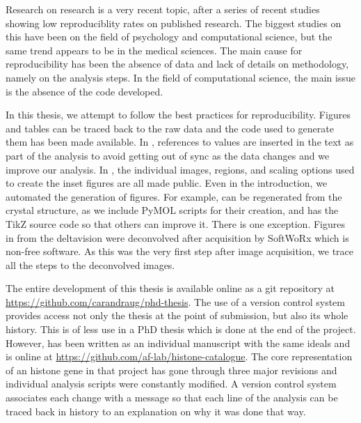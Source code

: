 
Research on research is a very recent topic, after a series of recent
studies showing low reproduciblity rates on published research.  The
biggest studies on this have been on the field of psychology and
computational science, but the same trend appears to be in the medical
sciences.  The main cause for reproducibility has been the absence of
data and lack of details on methodology, namely on the analysis steps.
In the field of computational science, the main issue is the absence
of the code developed.

In this thesis, we attempt to follow the best practices for
reproducibility.  Figures and tables can be traced back to the raw
data and the code used to generate them has been made available.  In
, references to values are inserted in the
text as part of the analysis to avoid getting out of sync as the data
changes and we improve our analysis.  In , the
individual images, regions, and scaling options used to create the
inset figures are all made public.  Even in the introduction, we
automated the generation of figures.  For example,
 can be regenerated from the
crystal structure, as we include PyMOL scripts for their creation, and
 has the TikZ source code so that
others can improve it.  There is one exception.  Figures in
 from the deltavision were deconvolved after
acquisition by SoftWoRx which is non-free software.  As this was the
very first step after image acquisition, we trace all the steps to the
deconvolved images.


The entire development of this thesis is available online as a git
repository at \url{https://github.com/carandraug/phd-thesis}.  The use
of a version control system provides access not only the thesis at the
point of submission, but also its whole history.  This is of less use
in a PhD thesis which is done at the end of the project.  However,
 has been written as an individual
manuscript with the same ideals and is online at
\url{https://github.com/af-lab/histone-catalogue}.  The core
representation of an histone gene in that project has gone through
three major revisions and individual analysis scripts were constantly
modified.  A version control system associates each change with a
message so that each line of the analysis can be traced back in
history to an explanation on why it was done that way.

